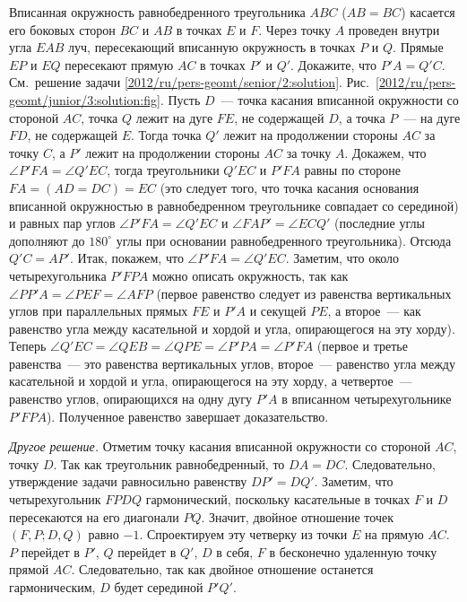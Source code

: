 \problem
Вписанная окружность равнобедренного треугольника $ABC$ ($AB = BC$) касается
его боковых сторон $BC$ и $AB$ в точках $E$ и $F$.
Через точку $A$ проведен внутри угла $EAB$ луч, пересекающий вписанную
окружность в точках $P$ и $Q$.
Прямые $EP$ и $EQ$ пересекают прямую $AC$ в точках $P'$ и $Q'$.
Докажите, что $P'A = Q'C$.
\solution
\label{2012/ru/pers-geomt/junior/3:solution}%
\ifsolutiondefined
См.~решение задачи \ref{2012/ru/pers-geomt/senior/2:solution}.
\else
{}
Рис.~\ref{2012/ru/pers-geomt/junior/3:solution:fig}.
Пусть $D$~--- точка касания вписанной окружности со стороной $AC$,
точка $Q$ лежит на дуге $FE$, не содержащей $D$,
а точка $P$~--- на дуге $FD$, не содержащей $E$.
Тогда точка $Q'$ лежит на продолжении стороны $AC$ за точку $C$,
а $P'$ лежит на продолжении стороны $AC$ за точку $A$.
Докажем, что $\angle P'FA = \angle Q'EC$, тогда треугольники $Q'EC$ и $P'FA$
равны по стороне $FA = (AD = DC) = EC$
(это следует того, что точка касания основания вписанной окружностью
в равнобедренном треугольнике совпадает со серединой)
и равных пар углов $\angle P'FA = \angle Q'EC$ и $\angle FAP' = \angle ECQ'$
(последние углы дополняют до $180^\circ$ углы при основании равнобедренного
треугольника).
Отсюда $Q'C = AP'$.
Итак, покажем, что $\angle P'FA = \angle Q'EC$.
Заметим, что около четырехугольника $P'FPA$ можно описать окружность, так как
$\angle PP'A = \angle PEF = \angle AFP$
(первое равенство следует из равенства вертикальных углов при параллельных
прямых $FE$ и $P'A$ и секущей $PE$, а второе~--- как равенство угла между
касательной и хордой и угла, опирающегося на эту хорду).
Теперь
\(
    \angle Q'EC = \angle QEB = \angle QPE = \angle P'PA = \angle P'FA
\)
(первое и третье равенства~--- это равенства вертикальных углов,
второе~--- равенство угла между касательной и хордой и угла, опирающегося на
эту хорду, а четвертое~--- равенство углов, опирающихся на одну дугу $P'A$
в вписанном четырехугольнике $P'FPA$).
Полученное равенство завершает доказательство.
\par
\emph{Другое решение.}
Отметим точку касания вписанной окружности со стороной $AC$, точку $D$.
Так как треугольник равнобедренный, то $DA = DC$.
Следовательно, утверждение задачи равносильно равенству $DP' = DQ'$.
Заметим, что четырехугольник $FPDQ$ гармонический, поскольку касательные в
точках $F$ и $D$ пересекаются на его диагонали $PQ$.
Значит, двойное отношение точек $(F, P; D, Q)$ равно $-1$.
Спроектируем эту четверку из точки $E$ на прямую $AC$.
$P$ перейдет в $P'$, $Q$ перейдет в $Q'$, $D$ в себя, $F$ в бесконечно
удаленную точку прямой $AC$.
Следовательно, так как двойное отношение останется гармоническим, $D$ будет
серединой $P'Q'$.
\fi %
\endproblem
